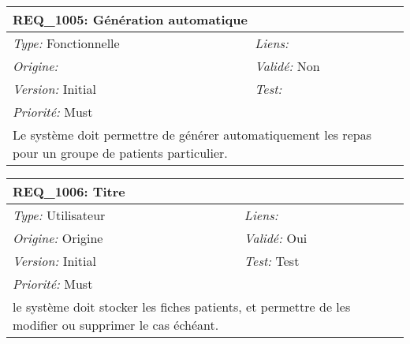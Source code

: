 \begin{table}[!h]

\begin{tabular}{|p{60mm}p{100mm}|}

\hline

\multicolumn{2}{|l|}{\textbf{REQ\_1005:} Génération automatique} \\ \hline

\emph{Type:} Fonctionnelle & \emph{Liens:}  \\

\emph{Origine:}  & \emph{Validé:} Non \\

\emph{Version:} Initial & \emph{Test:}  \\

\emph{Priorité:} Must & \\ \hline

\multicolumn{2}{|p{16cm}|}{Le système doit permettre de générer automatiquement les repas pour un groupe de patients particulier.} \\ \hline

\end{tabular}

\end{table}



\begin{table}[!h]

\begin{tabular}{|p{60mm}p{100mm}|}

\hline

\multicolumn{2}{|l|}{\textbf{REQ\_1006:} Titre} \\ \hline

\emph{Type:} Utilisateur & \emph{Liens:}  \\

\emph{Origine:} Origine & \emph{Validé:} Oui \\

\emph{Version:} Initial & \emph{Test:} Test \\

\emph{Priorité:} Must & \\ \hline

\multicolumn{2}{|p{16cm}|}{le système doit stocker les fiches patients, et permettre de les modifier ou supprimer le cas échéant.} \\ \hline

\end{tabular}

\end{table}



